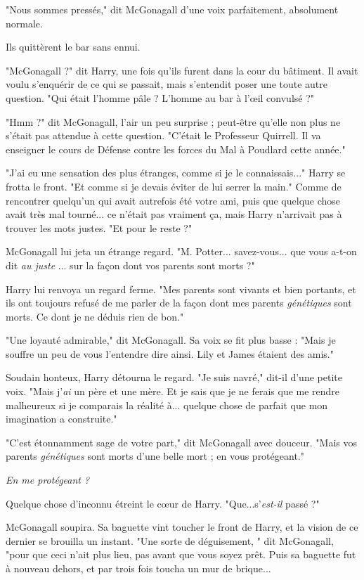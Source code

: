 "Nous sommes pressés," dit McGonagall d'une voix parfaitement, absolument normale.

Ils quittèrent le bar sans ennui.

"McGonagall ?" dit Harry, une fois qu'ils furent dans la cour du bâtiment. Il avait voulu s'enquérir de ce qui se passait, mais s'entendit poser une toute autre question. "Qui était l'homme pâle ? L'homme au bar à l'œil convulsé ?"

"Hmm ?" dit McGonagall, l'air un peu surprise ; peut-être qu'elle non plus ne s'était pas attendue à cette question. "C'était le Professeur Quirrell. Il va enseigner le cours de Défense contre les forces du Mal à Poudlard cette année."

"J'ai eu une sensation des plus étranges, comme si je le connaissais..." Harry se frotta le front. "Et comme si je devais éviter de lui serrer la main." Comme de rencontrer quelqu'un qui avait autrefois été votre ami, puis que quelque chose avait très mal tourné... ce n'était pas vraiment ça, mais Harry n'arrivait pas à trouver les mots justes. "Et pour le reste ?"

McGonagall lui jeta un étrange regard. "M. Potter... savez-vous... que vous a-t-on dit \emph{au juste} ... sur la façon dont vos parents sont morts ?"

Harry lui renvoya un regard ferme. "Mes parents sont vivants et bien portants, et ils ont toujours refusé de me parler de la façon dont mes parents \emph{génétiques}  sont morts. Ce dont je ne déduis rien de bon."

"Une loyauté admirable," dit McGonagall. Sa voix se fit plus basse : "Mais je souffre un peu de vous l'entendre dire ainsi. Lily et James étaient des amis."

Soudain honteux, Harry détourna le regard. "Je suis navré," dit-il d'une petite voix. "Mais j'\emph{ai}  un père et une mère. Et je sais que je ne ferais que me rendre malheureux si je comparais la réalité à... quelque chose de parfait que mon imagination a construite."

"C'est étonnamment sage de votre part," dit McGonagall avec douceur. "Mais vos parents \emph{génétiques } sont morts d'une belle mort ; en vous protégeant."

\emph{En me protégeant ?} 

Quelque chose d'inconnu étreint le cœur de Harry. "Que...s'\emph{est-il}  passé ?"

McGonagall soupira. Sa baguette vint toucher le front de Harry, et la vision de ce dernier se brouilla un instant. "Une sorte de déguisement, " dit McGonagall, "pour que ceci n'ait plus lieu, pas avant que vous soyez prêt. Puis sa baguette fut à nouveau dehors, et par trois fois toucha un mur de brique...

